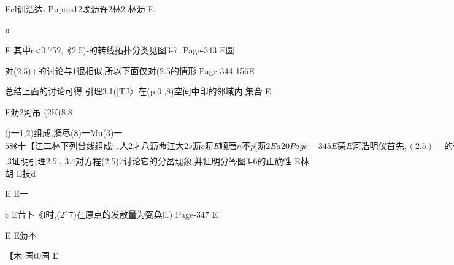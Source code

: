{{{{{{{{{{{{{{{{{{{{Eel训浩达i
Pnpois12晚沥许2林2
林沥
E

u

E
其中c<0.752,《2.5)-的转线拓扑分类见图3-7.
Page-343
E圆

对(2.5)+的讨论与1很相似,所以下面仅对(2.5的情形
Page-344
156E

总结上面的讨论可得
引理3.1([TJ〉在(p,0,,8)空间中印的邻域内,集合
E

E沥2河吊
(2K(8,8}(j一1,2)组成,漪尽(8)一Mu(3)一$58《十
【江

二林
下列曾线组成:,

人2才八沥命江大2

s沥c沥
E

顺唐n
不p
[沥2

Ea20
Page-345
E蒙

E河浩明仪

首先,(2.5)-的奇点满尼y一0及az一a一0.与第一章例
玟

其次考察e一0的情形这时(z,y)二(0,0)是(2.5)-的唯
E

E
[小
医余江

程应用第二章公式(3.3〉可得，Re(q)=_告<o.因此,由第二章

定理8.1知,在曲线H上发生Hopf分岔.
E

人一
E河加0
蕃=撕窑=z〔蹴十厥首_麟澈′
E月

当0一8人1时的扰动系统.系统(2.8)有首次积分
H位靓)=誓_吾十誓=允【

Ei

E沥的两条对称闭轨，当颢峥_盖时,它们分别缩

向这两个奇点f当~0*时,它们扩大而形成鞋点(0,0)的对称双

[一

见图3-8.若令工二DU,其中
E
Page-346
沥人157

u一才
E标
宁【

办(8一MMo(3)一8一十O(8e3),8一0怡式0.
E园
E
曲缇

0
[
E述芸切月
肖(3)一口(二酥CM(89一Mo(8))一688十O(8p-1,
其中8央0.定理3.2得证,【

题与怡考题三

31在引理1.6和引理1.7中,为什么要分别利用对参数一致的同宿分
岷定理和对参数一致的Hopt分岔定理?这对最终得到定理1.1有什么作用?
3.2证明引理2
$.3证明引理2.5.,
3.4对方程(2.5)7讨论它的分岔现象,并证明分岑图3-6的正确性
E林胡
E技d

E
E一

c
E昔卜《l时,(2^7)在原点的发散量为弼奂0.)
Page-347
E

E
E沥不

【木
园t0园
E

}}}}}}}}}}}}}}}}}}}
